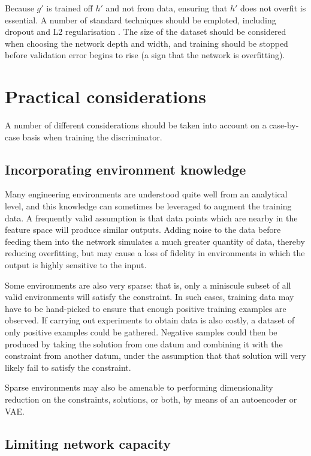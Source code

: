 \documentclass[../../main.tex]{subfiles}
\begin{document}
Because $g'$ is trained off $h'$ and not from data, ensuring that $h'$ does not overfit is essential.
A number of standard techniques should be emploted, including dropout \cite{srivastava14} and L2 regularisation \cite{krogh92}.
The size of the dataset should be considered when choosing the network depth and width, and training should be stopped before validation error begins to rise (a sign that the network is overfitting).

\section{Practical considerations} \label{section:practicalConsiderations}

A number of different considerations should be taken into account on a case-by-case basis when training the discriminator.

\subsection{Incorporating environment knowledge} \label{subsection:incorporatingEnvironmentKnowledge}

Many engineering environments are understood quite well from an analytical level, and this knowledge can sometimes be leveraged to augment the training data.
A frequently valid assumption is that data points which are nearby in the feature space will produce similar outputs.
Adding noise to the data before feeding them into the network simulates a much greater quantity of data, thereby reducing overfitting, but may cause a loss of fidelity in environments in which the output is highly sensitive to the input.

Some environments are also very sparse: that is, only a miniscule subset of all valid environments will satisfy the constraint.
In such cases, training data may have to be hand-picked to ensure that enough positive training examples are observed.
If carrying out experiments to obtain data is also costly, a dataset of only positive examples could be gathered.
Negative samples could then be produced by taking the solution from one datum and combining it with the constraint from another datum, under the assumption that that solution will very likely fail to satisfy the constraint.

Sparse environments may also be amenable to performing dimensionality reduction on the constraints, solutions, or both, by means of an autoencoder or VAE.

\subsection{Limiting network capacity} \label{subsection:limitingNetworkCapacity}
\end{document}
